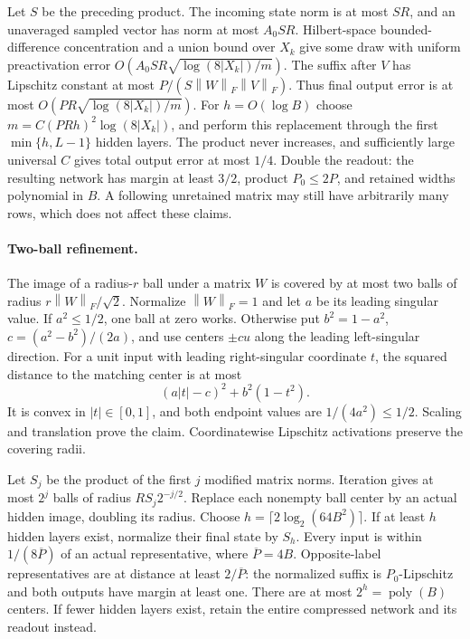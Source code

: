 \documentclass[11pt]{article}
\theoremstyle{remark}\newtheorem{remark}[theorem]{Remark}
\newcommand{\norm}[1]{\left\lVert#1\right\rVert}
\newcommand{\poly}{\operatorname{poly}}
\begin{document}
Let $S$ be the preceding product. The incoming state norm is at
most $SR$, and an unaveraged sampled vector has norm at most
$A_0SR$. Hilbert-space bounded-difference concentration and a
union bound over $X_k$ give some draw with uniform preactivation
error $O(A_0SR\sqrt{\log(8|X_k|)/m})$.
The suffix after $V$ has Lipschitz constant at most
$P/(S\norm W_F\norm V_F)$. Thus final output error is at most
$O(PR\sqrt{\log(8|X_k|)/m})$.
For $h=O(\log B)$ choose
$m=C(PRh)^2\log(8|X_k|)$, and perform this replacement through
the first $\min\{h,L-1\}$ hidden layers. The product never
increases, and sufficiently large universal $C$ gives total
output error at most $1/4$. Double the readout: the resulting
network has margin at least $3/2$, product $P_0\le2P$, and
retained widths polynomial in $B$. A following unretained matrix
may still have arbitrarily many rows, which does not affect these
claims.

\paragraph{Two-ball refinement.}
The image of a radius-$r$ ball under a matrix $W$ is covered by at
most two balls of radius $r\norm W_F/\sqrt2$.
Normalize $\norm W_F=1$ and let $a$ be its leading singular value.
If $a^2\le1/2$, one ball at zero works. Otherwise put
$b^2=1-a^2$, $c=(a^2-b^2)/(2a)$, and use centers $\pm cu$ along
the leading left-singular direction. For a unit input with
leading right-singular coordinate $t$, the squared distance to
the matching center is at most
\[
 (a|t|-c)^2+b^2(1-t^2).
\]
It is convex in $|t|\in[0,1]$, and both endpoint values are
$1/(4a^2)\le1/2$. Scaling and translation prove the claim.
Coordinatewise Lipschitz activations preserve the covering radii.

Let $S_j$ be the product of the first $j$ modified matrix norms.
Iteration gives at most $2^j$ balls of radius $RS_j2^{-j/2}$.
Replace each nonempty ball center by an actual hidden image,
doubling its radius. Choose
$h=\lceil2\log_2(64B^2)\rceil$.
If at least $h$ hidden layers exist, normalize their final state
by $S_h$. Every input is within $1/(8\overline P)$ of an actual
representative, where $\overline P=4B$. Opposite-label
representatives are at distance at least $2/\overline P$:
the normalized suffix is $P_0$-Lipschitz and both outputs have
margin at least one. There are at most $2^h=\poly(B)$ centers.
If fewer hidden layers exist, retain the entire compressed
network and its readout instead.
\end{document}
